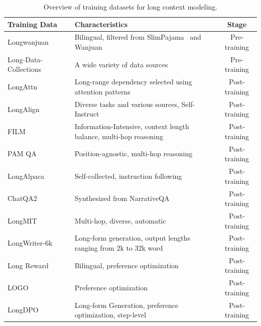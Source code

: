 \documentclass[11pt, a4paper, logo, copyright, nonumbering]{map}
\begin{document}
    





\begin{table}[t]
    \centering
    \footnotesize
    \renewcommand{\arraystretch}{1.25}
    
    \begin{tabular}{llc}
    \toprule
    {\textbf{Training Data}}  &{\textbf{Characteristics}} & \textbf{Stage}  \\ 
    \midrule
    Longwanjuan~\citep{liu-etal-2024-longwanjuan} &   Bilingual, 
     filtered from SlimPajama~\citep{slimpajama} and Wanjuan~\citep{He2023WanJuanAC} & Pre-training  \\
    Long-Data-Collections~\citep{longdata} &  A wide variety of data sources &Pre-training\\
    LongAttn~\citep{wu2025longattn} & Long-range dependency selected using attention patterns & Post-training \\
    \midrule
LongAlign~\citep{longalign}& Diverse tasks and various sources, Self-Instruct & Post-training\\
FILM~\citep{an2024make} & Information-Intensive, context length balance, multi-hop reasoning& Post-training\\
PAM QA~\citep{pamqa}&Position-agnostic,  multi-hop reasoning& Post-training\\
LongAlpaca~\citep{longlora}&Self-collected, instruction following&Post-training\\
ChatQA2~\citep{Xu2024ChatQA2B}& Synthesized from NarrativeQA~\citep{narrativeqa}&Post-training\\
LongMIT~\citep{Chen2024WhatAT} &Multi-hop, diverse, automatic&Post-training \\ 
LongWriter-6k~\citep{bai2024longwriter}&Long-form generation, output lengths ranging from 2k to 32k word&Post-training\\
Long Reward~\citep{zhang2024longreward}&Bilingual, preference optimization&Post-training\\
LOGO~\citep{tang2024logo}&Preference optimization&Post-training\\
LongDPO~\citep{ping2025longdpounlockbetterlongform}&Long-form Generation, preference optimization, step-level&Post-training\\

     \bottomrule
    \end{tabular}%
    \caption{Overview of training datasets for long context modeling.}
    \label{tab:dataset_compare}
\end{table}
\end{document}
